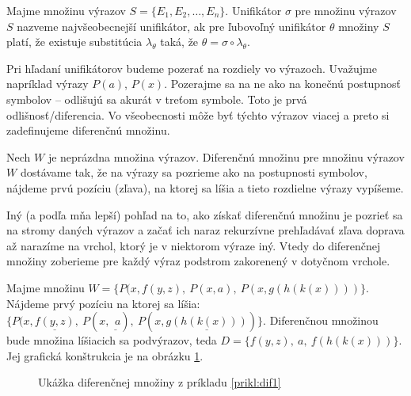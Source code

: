 \begin{definicia}
    Majme množinu výrazov $S=\{ E_1, E_2, \ldots, E_n\}$.
    Unifikátor $\sigma$ pre množinu výrazov $S$ nazveme 
    najvšeobecnejší unifikátor, ak pre ľubovoľný unifikátor $\theta$
    množiny $S$ platí, že existuje substitúcia 
    $\lambda_{\theta}$ taká, že $\theta = \sigma \circ \lambda_{\theta}$.
\end{definicia}

\medskip
Pri hľadaní unifikátorov budeme pozerať na rozdiely vo výrazoch.
Uvažujme napríklad výrazy $P(a)$, $P(x)$.
Pozerajme sa na ne ako na konečnú postupnosť symbolov -- 
odlišujú sa akurát v treťom symbole. Toto je prvá odlišnosť/diferencia.
Vo všeobecnosti môže byť týchto výrazov viacej a preto si zadefinujeme
diferenčnú množinu.

\begin{definicia}
Nech $W$ je neprázdna množina výrazov.
Diferenčnú množinu pre množinu výrazov $W$ dostávame tak, 
že na výrazy sa pozrieme ako na postupnosti symbolov, nájdeme prvú pozíciu
(zľava), na ktorej sa líšia a tieto rozdielne výrazy vypíšeme.
\end{definicia}

\begin{poznamka}
    Iný (a podľa mňa lepší) pohľad na to, ako získať diferenčnú množinu je
    pozrieť sa na stromy daných výrazov a začať ich naraz rekurzívne
    prehľadávať zľava doprava až narazíme na vrchol, ktorý je v niektorom
    výraze iný. Vtedy do diferenčnej množiny zoberieme pre každý výraz
    podstrom zakorenený v dotyčnom vrchole.
\end{poznamka}

\begin{priklad}
    \label{prikl:dif1}
    Majme množinu $W = \{P(x,f(y,z),\ P(x,a),\ P(x,g(h(k(x))))\}$.
    Nájdeme prvý pozíciu na ktorej sa líšia:
    $\{P(x,\underline{f(y,z)},\ P(x,\underline{\phantom{(}\!a}),\
    P(x,\underline{g(h(k(x)))}) \}$.
    Diferenčnou množinou bude množina líšiacich sa podvýrazov, teda
    $D= \{ f(y,z),\ a,\ f(h(k(x)))\}$. Jej grafická konštrukcia je na
    obrázku \ref{fig:dif1}.
    \begin{figure}[h]
        \centering

        \caption{Ukážka diferenčnej množiny z príkladu \ref{prikl:dif1}}
        \label{fig:dif1}
    \end{figure}
\end{priklad}

